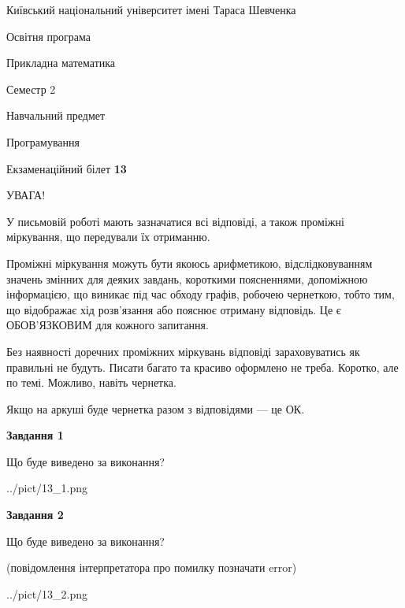 \documentclass[12pt, ukrainian]{article}
\begin{document}
{{\begin {small}\par
{ \center  Київський національний університет імені Тараса Шевченка \par}
{\parbox {5 cm}{Освітня програма \hfill}{\parbox {7 cm}{Прикладна математика\hfill}}\parbox {6 cm}{\hfill Семестр 2}}\par
{\parbox {5 cm} {Навчальний предмет \hfill}\parbox {7 cm}{Програмування \hfill}\parbox {6cm}{\hfill}\par}\vspace{-7pt} \end{small}}{\center Екзаменаційний білет \No \textbf
{ 13 }\par}}
{
\begin {large}
УВАГА!

У письмовій роботі мають зазначатися всі відповіді, а також проміжні міркування, що передували їх отриманню.

Проміжні міркування можуть бути якоюсь арифметикою, відслідковуванням зна\-чень змінних для деяких завдань,
короткими поясненнями, допоміжною інформацією, що виникає під час обходу графів, робочею чернеткою,
тобто тим, що відображає хід розв’язання або пояснює отриману відповідь.
Це є ОБОВ’ЯЗКОВИМ для кожного запитання.

Без наявності доречних проміжних міркувань відповіді зараховуватись як правиль\-ні не будуть.
Писати багато та красиво оформлено не треба. Коротко, але по темі. Можли\-во, навіть чернетка.

Якщо на аркуші буде чернетка разом з відповідями --- це ОК.

\newpage

{\begin {center}\textbf{Завдання 1}\end {center}}\par
Що буде виведено за виконання?\par
\begin{center}
	{../pict/13_1.png}
\end{center}
\newpage

{\begin {center}\textbf{Завдання 2}\end {center}}\par
Що буде виведено за виконання?\par
 (повідомлення інтерпретатора про помилку позначати error)\par
\begin{center}
	{../pict/13_2.png}
\end{center}
\newpage


\end{large}}
\end{document}
